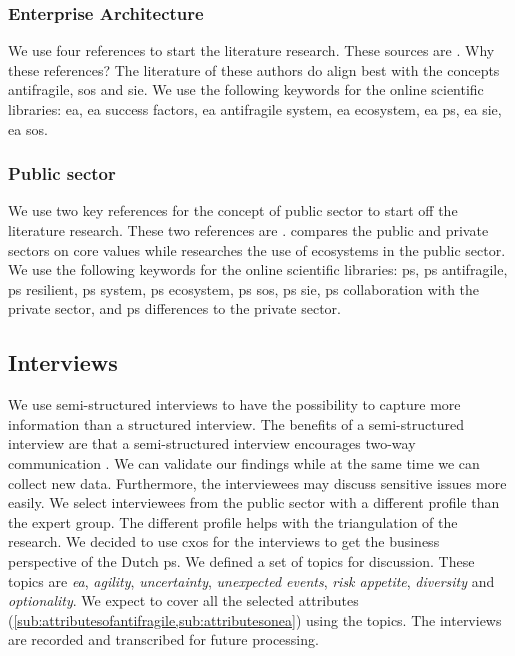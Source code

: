 \subsubsection{Enterprise Architecture}
\label{subsub:enterprisearchitecture}
We use four references to start the literature research. These sources are \textcites{Dietz2008}{Graves2008}{Hoogervorst2009}{Lapalme2012b}. Why these references? The literature of these authors do align best with the concepts \gls{antifragile}, \gls{sos} and \gls{sie}. We use the following keywords for the online scientific libraries: \gls{ea}, \gls{ea} success factors, \gls{ea} \gls{antifragile} system, \gls{ea} ecosystem, \gls{ea} \gls{ps}, \gls{ea} \gls{sie}, \gls{ea} \gls{sos}.

\subsubsection{Public sector}
\label{subsub:publicsector}
We use two key references for the concept of public sector to start off the literature research. These two references are \textcites{Wal2008}{Nurmi2021}. \textcite{Wal2008} compares the public and private sectors on core values while \textcite{Nurmi2021} researches the use of ecosystems in the public sector. We use the following keywords for the online scientific libraries: \gls{ps}, \gls{ps} \gls{antifragile}, \gls{ps} \gls{resilient}, \gls{ps} system, \gls{ps} ecosystem, \gls{ps} \gls{sos}, \gls{ps} \gls{sie}, \gls{ps} collaboration with the private sector, and \gls{ps} differences to the private sector.

\subsection{Interviews}
\label{sub:interviews}
We use semi-structured interviews to have the possibility to capture more information than a structured interview. The benefits of a semi-structured interview are that a semi-structured interview encourages two-way communication \parencite[p.~91]{Recker2012}. We can validate our findings while at the same time we can collect new data. Furthermore, the interviewees may discuss sensitive issues more easily. We select interviewees from the public sector with a different profile than the expert group. The different profile helps with the triangulation of the research. We decided to use \glspl{cxo} for the interviews to get the business perspective of the Dutch \gls{ps}. We defined a set of topics for discussion. These topics are \textit{\gls{ea}}, \textit{\gls{agility}}, \textit{\gls{uncertainty}}, \textit{unexpected events}, \textit{risk appetite}, \textit{\gls{diversity}} and \textit{\gls{optionality}}. We expect to cover all the selected attributes (\cref{sub:attributesofantifragile,sub:attributesonea}) using the topics. The interviews are recorded and transcribed for future processing.

